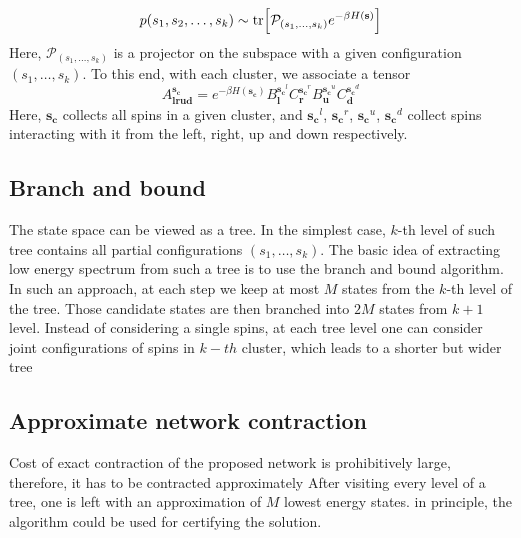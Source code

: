\begin{equation}
    p(s_1, s_2, \ldots, s_k) \sim \tr[\mathcal{P}_{(s_1, \ldots, s_k)} e^{-\beta H(\mathbf{s})}]
\end{equation}
Here, $\mathcal{P}_{(s_1, \ldots, s_k)}$ is a projector on the subspace with a given configuration $(s_1, \ldots, s_k)$.
To this end, with each cluster, we associate a tensor
\begin{equation}
A^{\mathbf{s_c}}_{\mathbf{lrud}} = e^{-\beta H(\mathbf{s_c})} B^{\mathbf{s_c}^l}_\mathbf{l}C^{\mathbf{s_c}^r}_\mathbf{r}B^{\mathbf{s_c}^u}_\mathbf{u}C^{\mathbf{s_c}^d}_\mathbf{d}
\end{equation}
Here, $\mathbf{s_c}$ collects all spins in a given cluster, and $\mathbf{s_c}^l$, $\mathbf{s_c}^r$, $\mathbf{s_c}^u$, $\mathbf{s_c}^d$ collect spins interacting with it from the left, right, up and down respectively.


\subsection{Branch and bound}
The state space can be viewed as a tree. In the simplest case, $k$-th level of such tree contains all partial configurations $(s_1, \ldots, s_k)$. The basic idea of extracting low energy spectrum from such a tree is to use the branch and bound algorithm. In such an approach, at each step we keep at most $M$ states from the $k$-th level of the tree. Those candidate states are then branched into $2M$ states from $k+1$ level. Instead of considering a single spins, at each tree level one can consider joint configurations of spins in $k-th$ cluster,
which leads to a shorter but wider tree 
\subsection{Approximate network contraction}
Cost of exact contraction of the proposed network is prohibitively large, therefore, it has to be contracted approximately
After visiting every level of a tree, one is left with an approximation of $M$ lowest energy states. in principle, the algorithm could be used for certifying the solution.

